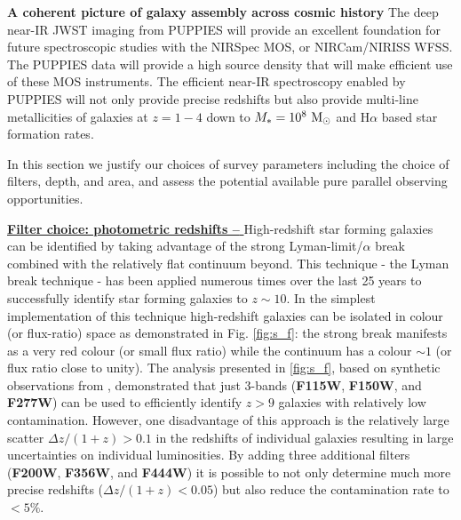 \documentclass[12pt]{article}
\begin{document}
\vspace{2mm}
\noindent
\textbf{A coherent picture of galaxy assembly across cosmic history} The deep near-IR JWST imaging from PUPPIES will provide an excellent foundation for future spectroscopic studies with the NIRSpec MOS, or NIRCam/NIRISS WFSS. The PUPPIES data will provide a high source density that will make efficient use of these MOS instruments. The efficient near-IR spectroscopy enabled by PUPPIES will not only provide precise redshifts but also provide multi-line metallicities of galaxies at $z=1-4$ down to $M_{*}=10^{8}\ {\rm M_{\odot}}$ and H$\alpha$ based star formation rates. 







%
%

\clearpage

\justifyobservations   %

In this section we justify our choices of survey parameters including the choice of filters, depth, and area, and assess the potential available pure parallel observing opportunities.

\vspace{2mm}
\noindent
\underline{\bf Filter choice: photometric redshifts -- } High-redshift star forming galaxies can be identified by taking advantage of the strong Lyman-limit/$\alpha$ break combined with the relatively flat continuum beyond. This technique - the Lyman break technique - has been applied numerous times over the last 25 years to successfully identify star forming galaxies to $z\sim 10$. In the simplest implementation of this technique high-redshift galaxies can be isolated in colour (or flux-ratio) space as demonstrated in Fig. \ref{fig:s_f}: the strong break manifests as a very red colour (or small flux ratio) while the continuum has a colour $\sim 1$ (or flux ratio close to unity). The analysis presented in \ref{fig:s_f}, based on synthetic observations from \citet{2018MNRAS.478.1694M}, demonstrated that just 3-bands ({\bf F115W}, {\bf F150W}, and {\bf F277W}) can be used to efficiently identify $z>9$ galaxies with relatively low contamination. However, one disadvantage of this approach is the relatively large scatter $\Delta z/(1+z)>0.1$ in the redshifts of individual galaxies resulting in large  uncertainties on individual luminosities. By adding three additional filters ({\bf F200W}, {\bf F356W}, and {\bf F444W}) it is possible to not only determine much more precise redshifts ($\Delta z/(1+z)<0.05$) but also reduce the contamination rate to $<5\%$. 
\end{document}
